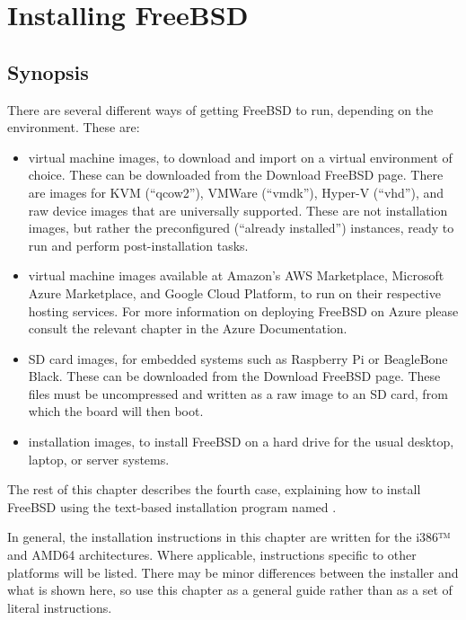 \chapter{Installing FreeBSD}
\label{chap:installing-freebsd}

\section{Synopsis}

There are several different ways of getting FreeBSD to run, depending on the environment.
These are:
\begin{itemize}
\item
   virtual machine images, to download and import on a virtual environment of choice.
   These can be downloaded from the Download FreeBSD page.
   There are images for KVM (``qcow2''), VMWare (``vmdk''), Hyper-V (``vhd''), and raw device images that are universally supported.
    These are not installation images, but rather the preconfigured (``already installed'') instances, ready to run and perform post-installation tasks.
\item
   virtual machine images available at Amazon's AWS Marketplace, Microsoft Azure Marketplace, and Google Cloud Platform, to run on their respective hosting services.
   For more information on deploying FreeBSD on Azure please consult the relevant chapter in the Azure Documentation.
\item
   SD card images, for embedded systems such as Raspberry Pi or BeagleBone Black.
   These can be downloaded from the Download FreeBSD page.
   These files must be uncompressed and written as a raw image to an SD card, from which the board will then boot.
\item
   installation images, to install FreeBSD on a hard drive for the usual desktop, laptop, or server systems.
\end{itemize}
The rest of this chapter describes the fourth case, explaining how to install FreeBSD using the text-based installation program named .

In general, the installation instructions in this chapter are written for the i386™ and AMD64 architectures.
Where applicable, instructions specific to other platforms will be listed.
There may be minor differences between the installer and what is shown here, so use this chapter as a general guide rather than as a set of literal instructions.

